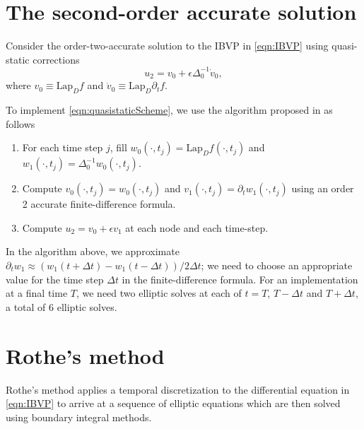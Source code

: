\documentclass[11pt]{article}
\numberwithin{equation}{section}
\newcommand{\Lap}[1]{\text{Lap}_{D}#1}
\newcommand{\lap}[1]{\Delta_{0}^{-1}#1}
\newcommand{\pt}{\partial_t}
\newcommand{\dt}{\Delta t}
\begin{document}
\section{The second-order accurate solution}\label{sec:O2sol}
Consider the order-two-accurate solution to the IBVP in \eqref{eqn:IBVP} using quasi-static corrections
\begin{equation}\label{eqn:quasistaticScheme}
u_2 = v_0 + \epsilon \Delta_0^{-1}\dot v_0, 
\end{equation}
where $v_0\equiv \Lap f$ and $\dot v_0\equiv\Lap\partial_t f$.

To implement \eqref{eqn:quasistaticScheme}, we use the algorithm proposed in \cite{quasistaticNotes} as follows 
\begin{enumerate}
\item For each time step $j$, fill $w_0(\cdot, t_j) = \Lap {f(\cdot, t_j)}$ and $w_1(\cdot, t_j) = \lap{w_0(\cdot, t_j)}$. 
\item Compute $v_0(\cdot, t_j) = w_0(\cdot, t_j)$ and $v_1(\cdot, t_j) = \pt w_1(\cdot, t_j)$ using an order 2 accurate finite-difference formula. 
\item Compute $u_2 = v_0 + \epsilon v_1$ at each node and each time-step. 
\end{enumerate}

In the algorithm above, we approximate $\pt w_1 \approx (w_1(t + \dt) - w_1(t - \dt))/2\dt$; we need to choose an appropriate value for the time step $\dt$ in the finite-difference formula. For an implementation at a final time $T$, we need two elliptic solves at each of $t = T$, $T - \dt$ and $T + \dt$, a total of 6 elliptic solves.  


\section{Rothe's method}
Rothe's method applies a temporal discretization to the differential equation in \eqref{eqn:IBVP} to arrive at a sequence of elliptic equations which are then solved using boundary integral methods.\\ 
\end{document}
